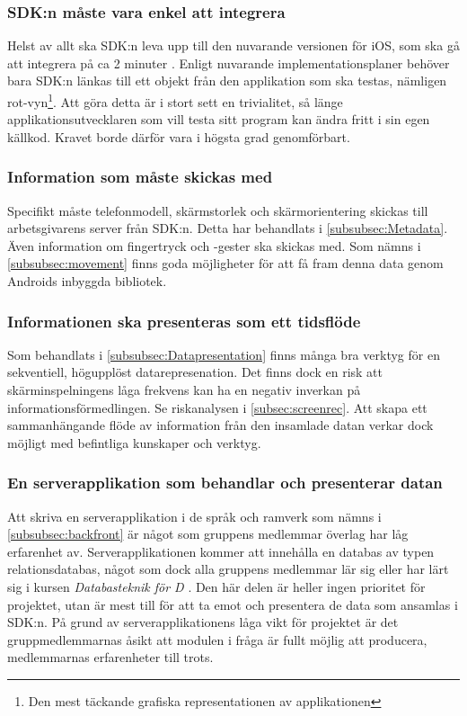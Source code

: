 \subsubsection{SDK:n måste vara enkel att integrera}
Helst av allt ska SDK:n leva upp till den nuvarande versionen för iOS, som ska gå att integrera på ca 2 minuter \parencite{superrec}. Enligt nuvarande implementationsplaner behöver bara SDK:n länkas till ett objekt från den applikation som ska testas, nämligen rot-vyn\footnote{Den mest täckande grafiska representationen av applikationen}. Att göra detta är i stort sett en trivialitet, så länge applikationsutvecklaren som vill testa sitt program kan ändra fritt i sin egen källkod. Kravet borde därför vara i högsta grad genomförbart.

\subsubsection{Information som måste skickas med}
Specifikt måste telefonmodell, skärmstorlek och skärmorientering skickas till arbetsgivarens server från SDK:n. Detta har behandlats i \ref{subsubsec:Metadata}. Även information om fingertryck och -gester ska skickas med. Som nämns i \ref{subsubsec:movement} finns goda möjligheter för att få fram denna data genom Androids inbyggda bibliotek.

\subsubsection{Informationen ska presenteras som ett tidsflöde}
Som behandlats i \ref{subsubsec:Datapresentation} finns många bra verktyg för en sekventiell, högupplöst datarepresenation. Det finns dock en risk att skärminspelningens låga frekvens kan ha en negativ inverkan på informationsförmedlingen. Se riskanalysen i \ref{subsec:screenrec}. Att skapa ett sammanhängande flöde av information från den insamlade datan verkar dock möjligt med befintliga kunskaper och verktyg.

\subsubsection{En serverapplikation som behandlar och presenterar datan}
Att skriva en serverapplikation i de språk och ramverk som nämns i \ref{subsubsec:backfront} är något som gruppens medlemmar överlag har låg erfarenhet av. Serverapplikationen kommer att innehålla en databas av typen relationsdatabas, något som dock alla gruppens medlemmar lär sig eller har lärt sig i kursen \textit{Databasteknik för D} \parencite{dbas}. Den här delen är heller ingen prioritet för projektet, utan är mest till för att ta emot och presentera de data som ansamlas i SDK:n. På grund av serverapplikationens låga vikt för projektet är det gruppmedlemmarnas åsikt att modulen i fråga är fullt möjlig att producera, medlemmarnas erfarenheter till trots.

